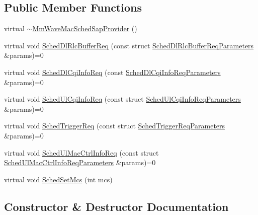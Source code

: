 \subsection*{Public Member Functions}
\begin{DoxyCompactItemize}
\item 
virtual \hyperlink{classns3_1_1MmWaveMacSchedSapProvider_a86c526f591b33773bdfbf06631a3c9df}{$\sim$\+Mm\+Wave\+Mac\+Sched\+Sap\+Provider} ()
\item 
virtual void \hyperlink{classns3_1_1MmWaveMacSchedSapProvider_a7cb4794297d2a0c8e198b0a70a919f05}{Sched\+Dl\+Rlc\+Buffer\+Req} (const struct \hyperlink{structns3_1_1MmWaveMacSchedSapProvider_1_1SchedDlRlcBufferReqParameters}{Sched\+Dl\+Rlc\+Buffer\+Req\+Parameters} \&params)=0
\item 
virtual void \hyperlink{classns3_1_1MmWaveMacSchedSapProvider_a20520fbb08538ce5b59d3ed99d3863d9}{Sched\+Dl\+Cqi\+Info\+Req} (const \hyperlink{structns3_1_1MmWaveMacSchedSapProvider_1_1SchedDlCqiInfoReqParameters}{Sched\+Dl\+Cqi\+Info\+Req\+Parameters} \&params)=0
\item 
virtual void \hyperlink{classns3_1_1MmWaveMacSchedSapProvider_a08a0cd027561ff8f4b8a1608cef7f493}{Sched\+Ul\+Cqi\+Info\+Req} (const struct \hyperlink{structns3_1_1MmWaveMacSchedSapProvider_1_1SchedUlCqiInfoReqParameters}{Sched\+Ul\+Cqi\+Info\+Req\+Parameters} \&params)=0
\item 
virtual void \hyperlink{classns3_1_1MmWaveMacSchedSapProvider_a9c7003064f331f767b455a0f5ca5e007}{Sched\+Trigger\+Req} (const struct \hyperlink{structns3_1_1MmWaveMacSchedSapProvider_1_1SchedTriggerReqParameters}{Sched\+Trigger\+Req\+Parameters} \&params)=0
\item 
virtual void \hyperlink{classns3_1_1MmWaveMacSchedSapProvider_ae5d5e3e266a5ca6177960882e996a48b}{Sched\+Ul\+Mac\+Ctrl\+Info\+Req} (const struct \hyperlink{structns3_1_1MmWaveMacSchedSapProvider_1_1SchedUlMacCtrlInfoReqParameters}{Sched\+Ul\+Mac\+Ctrl\+Info\+Req\+Parameters} \&params)=0
\item 
virtual void \hyperlink{classns3_1_1MmWaveMacSchedSapProvider_ab242b47e6ff5496039ee6595f8c3c45c}{Sched\+Set\+Mcs} (int mcs)
\end{DoxyCompactItemize}


\subsection{Constructor \& Destructor Documentation}
